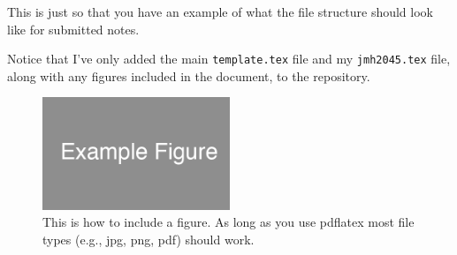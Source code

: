 
This is just so that you have an example of what the file structure should look like for submitted notes.

Notice that I've only added the main \texttt{template.tex} file and my \texttt{jmh2045.tex} file, along with any figures included in the document, to the repository.

\begin{figure}[ht]
  \begin{center}
    \includegraphics[width=0.5\textwidth]{figures/example_figure.png}
    \caption{
      This is how to include a figure.
      As long as you use pdflatex most file types (e.g., jpg, png, pdf) should work.}
    \label{fig:example_figure}
  \end{center}
\end{figure}

